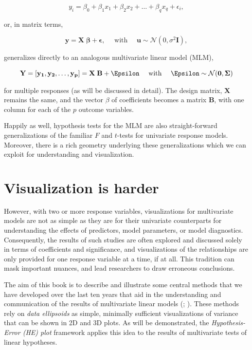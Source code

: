 \documentclass[
  letterpaper,
  10pt,
  krantz2]{krantz}
\newcommand{\ix}[1]{\index{#1}}
\begin{document}
\[y_i = \beta_0 + \beta_1 x_1 + \beta_2 x_2 + \dots + \beta_q x_q + \epsilon_i , \]

or, in matrix terms,

\[\mathbf{y} = \mathbf{X} \; \mathbf{\beta} + \mathbf{\epsilon}, \quad\mbox{   with   }\quad \mathbf{u} \sim \mathcal{N} (0, \sigma^2 \mathbf{I}) ,\]

generalizes directly to an analogous multivariate linear model (MLM),

\[\mathbf{Y} = [\mathbf{y_1}, \mathbf{y_2}, \dots, \mathbf{y_p}] = \mathbf{X} \; \mathbf{B} + \Epsilon \quad\mbox{   with   }\quad \Epsilon \sim \mathcal{N} (\mathbf{0}, \mathbf{\Sigma})\]

for multiple responses (as will be discussed in detail). The design
matrix, \(\mathbf{X}\) remains the same, and the vector \(\beta\) of
coefficients becomes a matrix \(\mathbf{B}\), with one column for each
of the \(p\) outcome variables.

Happily as well, hypothesis tests for the MLM are also straight-forward
generalizations of the familiar \(F\) and \(t\)-tests for univariate
response models. Moreover, there is a rich geometry underlying these
generalizations which we can exploit for understanding and
visualization.

\section{Visualization is harder}\label{visualization-is-harder}

However, with two or more response variables, visualizations for
multivariate models are not as simple as they are for their univariate
counterparts for understanding the effects of predictors, model
parameters, or model diagnostics. Consequently, the results of such
studies are often explored and discussed solely in terms of coefficients
and significance, and visualizations of the relationships are only
provided for one response variable at a time, if at all. This tradition
can mask important nuances, and lead researchers to draw erroneous
conclusions.

The aim of this book is to describe and illustrate some central methods
that we have developed over the last ten years that aid in the
understanding and communication of the results of multivariate linear
models (;
). These
methods rely on \emph{data ellipsoids} as simple, minimally sufficient
visualizations of variance that can be shown in 2D and 3D plots. As will
be demonstrated, the \emph{Hypothesis-Error (HE) plot} framework applies
this idea to the results of multivariate tests of linear hypotheses.
\ix{data ellipse} \ix{HE plot}
\end{document}
